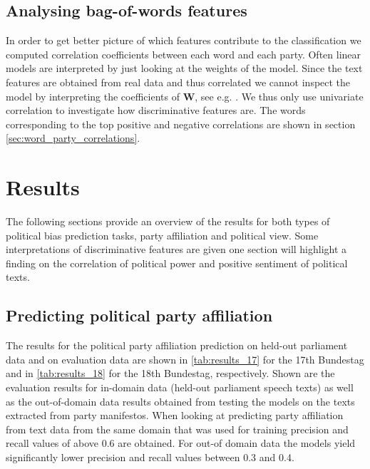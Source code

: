 \documentclass[runningheads,a4paper]{llncs}
\renewcommand{\vec}[1]{\mathbf{#1}}
\begin{document}
\subsection{Analysing bag-of-words features}\label{sec:correlations_methods}
In order to get  better picture of which features contribute to the classification we computed correlation coefficients between each word and each party. Often linear models are interpreted by just looking at the weights of the model. Since the text features are obtained from real data and thus correlated we cannot inspect the model by interpreting the coefficients of $\vec{W}$, see e.g. \cite{Haufe2013}.  We thus only use univariate correlation to investigate how discriminative features are. The words corresponding to the top positive and negative correlations are shown in section \autoref{sec:word_party_correlations}.

\section{Results}\label{sec:results}

The following sections provide an overview of the results for both types of political bias prediction tasks, party affiliation and political view. Some interpretations of discriminative features are given one section will highlight a finding on the correlation of political power and positive sentiment of political texts. 

\subsection{Predicting political party affiliation}
The results for the political party affiliation prediction on held-out parliament data and on evaluation data are shown in \autoref{tab:results_17} for the 17th Bundestag and in \autoref{tab:results_18} for the 18th Bundestag, respectively. 
Shown are the evaluation results for in-domain data (held-out parliament speech texts) as well as the out-of-domain data results obtained from testing the models on the texts extracted from party manifestos. When looking at predicting party affiliation from text data from the same domain that was used for training precision and recall values of above 0.6 are obtained. For out-of domain data the models yield significantly lower precision and recall values between 0.3 and 0.4.  \\
\end{document}
